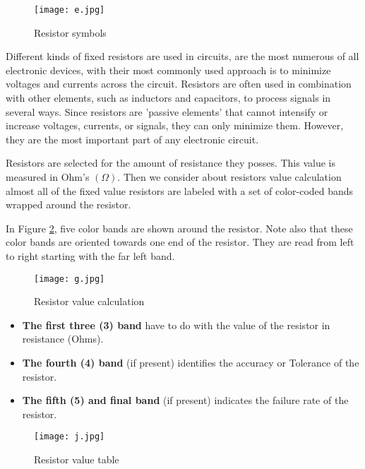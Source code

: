\documentclass[12pt,a4paper,oneside]{book}
\theoremstyle{plain}
\numberwithin{equation}{chapter} \DeclareMathOperator{\Var}{Var}
\begin{document}
\begin{figure}[hbt!]
    \centering
    \texttt{[image: e.jpg]}
    \caption{Resistor symbols}
    \label{fig:e}
\end{figure}

Different kinds of fixed resistors are used in circuits, are the most numerous of all electronic devices, with their most commonly used approach is to minimize voltages and currents across the circuit. Resistors are often used in combination with other elements, such as inductors and capacitors, to process signals in several ways. Since resistors are 'passive elements' that cannot intensify or increase voltages, currents, or signals, they can only minimize them. However, they are the most important part of any electronic circuit.

Resistors are selected for the amount of resistance they posses. This value is measured in Ohm’s $(\Omega)$. Then we consider about resistors value calculation almost all of the fixed value resistors are labeled with a set of color-coded bands wrapped around the resistor.

In Figure \ref{fig:g}, five color bands are shown around the resistor. Note also that these color bands are oriented towards one end of the resistor. They are read from left to right starting with the far left
band. 

\newpage

\begin{figure}[hbt!]
    \centering
    \texttt{[image: g.jpg]}
    \caption{Resistor value calculation}
    \label{fig:g}
\end{figure}

\begin{itemize}
    \item \textbf{The first three (3) band} have to do with the value of the resistor in resistance (Ohms). 
    \item \textbf{The fourth (4) band}  (if present) identifies the accuracy or Tolerance of the resistor. 
    \item \textbf{The fifth (5) and final band} (if present) indicates the failure rate of the resistor.
\end{itemize}

\begin{figure}[hbt!]
    \centering
    \texttt{[image: j.jpg]}
    \caption{Resistor value table}
    \label{fig:j}
\end{figure}
\end{document}
